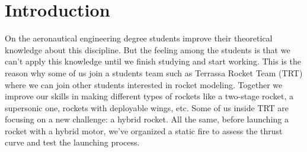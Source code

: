 
\section*{Introduction}

On the aeronautical engineering degree students improve their theoretical knowledge about this discipline. But the feeling among the students is that we can’t apply this knowledge until we finish studying and start working. This is the reason why some of us join a students team such as Terrassa Rocket Team (TRT) where we can join other students interested in rocket modeling. Together we improve our skills in making different types of rockets like a two-stage rocket, a supersonic one, rockets with deployable wings, etc. Some of us inside TRT are focusing on a new challenge: a hybrid rocket.
All the same, before launching a rocket with a hybrid motor, we've organized a static fire to assess the thrust curve and test the launching process.

